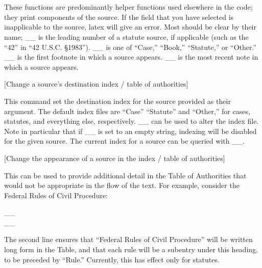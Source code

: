 \begin{Example}
    \\
    \\
\end{Example}

 \noindent These functions are predominantly helper functions used elsewhere in the code; they print components of the source. If the field
 that you have selected is inapplicable to the source, latex will give an error. Most should be clear by their name; _\Prefix_ is the 
 leading number of a statute source, if applicable (such as the ``42'' in ``42 U.S.C. \S 1983''). _\SrcType_ is one of ``Case,'' ``Book,'' 
 ``Statute,'' or ``Other.'' _\SupraNote_ is the first footnote in which a source appears. _\LastNote_ is the most recent note
 in which a source appears.


 [Change a source's destination index / table of authorities] 

 \noindent This command set the destination index for the source provided as their argument. The default index files are ``Case''
 ``Statute'' and ``Other,'' for cases, statutes, and everything else, respectively. _\SetIndexType_ can be used to alter the index file. 
 Note in particular that if _\SetIndexType_ is set to an empty string, indexing will be disabled for the given source. 
 The current index for a source can be queried with _\IndexType_. 


 [Change the appearance of a source in the index / table of authorities]

 \noindent This can be used to provide additional detail in the Table of Authorities that would not be appropriate in the flow of the text.
 For example, consider the Federal Rules of Civil Procedure:

 __ \\
 \hspace*{\parindent}__

 \noindent The second line ensures that ``Federal Rules of Civil Procedure'' will be written long form in the Table, and that each rule will
 be a subentry under this heading, to be preceded by ``Rule.'' Currently, this has effect only for statutes.


~\par

